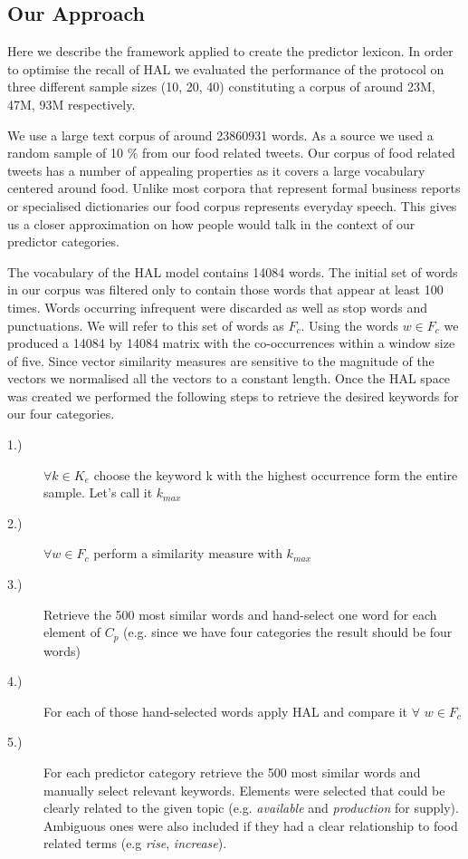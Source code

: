 \subsection{Our Approach}

Here we describe the framework applied to create the predictor lexicon. In order to optimise the recall of HAL we evaluated the performance of the protocol on three different sample sizes (10, 20, 40) constituting a corpus of around 23M, 47M, 93M respectively. 



We use a large text corpus of around 23860931 words. As a source we used a random sample of 10 \% from our food related tweets. Our corpus of food related tweets has a number of appealing properties as it covers a large vocabulary centered around food. Unlike most corpora that represent formal business reports or specialised dictionaries our food corpus represents everyday speech. This gives us a closer approximation on how people would talk in the context of our predictor categories. 

The vocabulary of the HAL model contains 14084 words. The initial set of words in our corpus was filtered only to contain those words that appear at least 100 times. Words occurring infrequent were discarded as well as stop words and punctuations. We will refer to this set of words as $F_c$. Using the words $w \in F_c$ we produced a 14084 by 14084 matrix with the co-occurrences within a window size of five. Since vector similarity measures are sensitive to the magnitude of the vectors we normalised all the vectors to a constant length. Once the HAL space was created we performed the following steps to retrieve the desired keywords for our four categories. 


\begin{description}
  \item[1.)] $\forall k \in K_e$ choose the keyword k with the highest occurrence form the entire sample. Let's call it $k_{max}$  
  \item[2.)] $\forall w \in F_c $ perform a similarity measure with $k_{max}$
  \item[3.)] Retrieve the 500 most similar words and hand-select one word for each element of $C_p$ (e.g. since we have four categories the result should be four words)
  \item[4.)] For each of those hand-selected words  apply HAL and compare it $\forall$ $w \in F_c $
  \item[5.)] For each predictor category retrieve the 500 most similar words and manually select relevant keywords. Elements were selected that could be clearly related to the given topic (e.g. \emph{available} and \emph {production} for supply). Ambiguous ones were also included if they had a clear relationship to food related terms (e.g \emph{rise}, \emph {increase}).
  \end{description}

